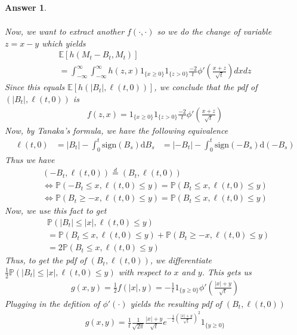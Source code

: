\documentclass[12pt]{article}
\theoremstyle{colon}
\newtheorem*{answer}{Answer}
\begin{document}
\begin{answer}
\begin{enumerate}[label=\alph*)]
\begin{gather*}
      \end{gather*}
      Now, we want to extract another $f(\cdot,\cdot)$ so we do the change of variable $z = x - y$ which yields
      \begin{gather*}
        \mathbb{E}[h(M_t - B_t, M_t)] \\= \int_{-\infty}^\infty \int_{-\infty}^\infty h(z, x) 1_{\{x \geq 0\}} 1_{\{z > 0\}} \frac{-2}{t}\phi'(\frac{x + z}{\sqrt{t}}) dx dz
      \end{gather*}
      Since this equals $\mathbb{E}[h(\lvert B_t \rvert, \ell(t,0))]$, we conclude that the pdf of \\ $(\lvert B_t \rvert, \ell(t,0))$ is
      \begin{gather*}
        f(z,x) = 1_{\{x \geq 0\}} 1_{\{z > 0\}} \frac{-2}{t}\phi'(\frac{x + z}{\sqrt{t}})
      \end{gather*}
      Now, by Tanaka's formula, we have the following equivalence
      \begin{align*}
        \ell(t,0) &= \lvert B_t \rvert - \int_0^t \text{sign}(B_s) \text{d}B_s
        &= \lvert -B_t \rvert - \int_0^t \text{sign}(-B_s) \text{d}(-B_s)
      \end{align*}
      Thus we have
      \begin{gather*}
        (-B_t, \ell(t,0)) \stackrel{d}{=} (B_t, \ell(t,0)) \\
        \Longleftrightarrow \mathbb{P}(-B_t \leq x, \ell(t,0) \leq y) = \mathbb{P}(B_t \leq x, \ell(t,0) \leq y) \\
        \Longleftrightarrow \mathbb{P}(B_t \geq -x, \ell(t,0) \leq y) = \mathbb{P}(B_t \leq x, \ell(t,0) \leq y)
      \end{gather*}
      Now, we use this fact to get
      \begin{align*}
        &\mathbb{P}(\lvert B_t \rvert  \leq \lvert x \rvert , \ell(t,0) \leq y) \\
        &= \mathbb{P}(B_t \leq x, \ell(t,0) \leq y) + \mathbb{P}(B_t \geq -x, \ell(t,0) \leq y) \\
        &= 2 \mathbb{P}(B_t \leq x, \ell(t,0) \leq y)
      \end{align*}
      Thus, to get the pdf of $(B_t, \ell(t,0))$, we differentiate \\ $\frac{1}{2} \mathbb{P}(\lvert B_t \rvert  \leq \lvert x \rvert , \ell(t,0) \leq y)$ with respect to $x$ and $y$. This gets us
      \begin{gather*}
        g(x,y) = \frac{1}{2} f(\lvert x \rvert, y) = -\frac{1}{t} 1_{\{y \geq 0\}} \phi'\left(\frac{\lvert x \rvert + y}{\sqrt{t}}\right)
      \end{gather*}
      Plugging in the defition of $\phi'(\cdot)$ yields the resulting pdf of $(B_t, \ell(t,0))$
      \begin{gather*}
        g(x,y) = \frac{1}{t} \frac{1}{\sqrt{2 \pi}} \frac{\lvert x \rvert + y}{\sqrt{t}} e^{-\frac{1}{2} (\frac{\lvert x \rvert + y}{\sqrt{t}})^2} 1_{\{y \geq 0\}}
      \end{gather*}
  \end{enumerate}
\end{answer}
\end{document}
